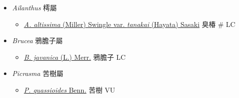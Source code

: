 
  \begin{itemize}
 \item[] \textit{Ailanthus} 樗屬
                                
  \begin{itemize}
        \item[] \href{http://www.theplantlist.org/tpl1.1/search?q=Ailanthus+altissima+var.+tanakai}{\textit{A. altissima} (Miller) Swingle var. \textit{tanakai} (Hayata) Sasaki}   臭椿  \# LC
  \end{itemize}
 \item[] \textit{Brucea} 鴉膽子屬
                                
  \begin{itemize}
        \item[] \href{http://www.theplantlist.org/tpl1.1/search?q=Brucea+javanica}{\textit{B. javanica} (L.) Merr.}   鴉膽子   LC
  \end{itemize}
 \item[] \textit{Picrasma} 苦樹屬
                                
  \begin{itemize}
        \item[] \href{http://www.theplantlist.org/tpl1.1/search?q=Picrasma+quassioides}{\textit{P. quassioides} Benn.}   苦樹   VU
  \end{itemize}
  \end{itemize}
